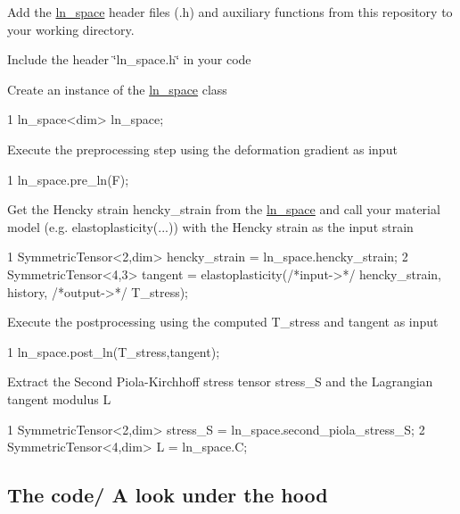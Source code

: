 \begin{DoxyItemize}
\item Add the \hyperlink{classln__space}{ln\+\_\+space} header files (.h) and auxiliary functions from this repository to your working directory.
\item Include the header \char`\"{}ln\+\_\+space.\+h\char`\"{} in your code
\item Create an instance of the \hyperlink{classln__space}{ln\+\_\+space} class 
\begin{DoxyCode}
1 ln\_space<dim> ln\_space;
\end{DoxyCode}

\item Execute the preprocessing step using the deformation gradient as input 
\begin{DoxyCode}
1 ln\_space.pre\_ln(F);
\end{DoxyCode}

\item Get the Hencky strain {\ttfamily hencky\+\_\+strain} from the \hyperlink{classln__space}{ln\+\_\+space} and call your material model (e.\+g. elastoplasticity(...)) with the Hencky strain as the input strain 
\begin{DoxyCode}
1 SymmetricTensor<2,dim> hencky\_strain = ln\_space.hencky\_strain;
2 SymmetricTensor<4,3> tangent = elastoplasticity(/*input->*/ hencky\_strain, history, /*output->*/ T\_stress);
\end{DoxyCode}

\item Execute the postprocessing using the computed {\ttfamily T\+\_\+stress} and tangent as input 
\begin{DoxyCode}
1 ln\_space.post\_ln(T\_stress,tangent);
\end{DoxyCode}

\item Extract the Second Piola-\/\+Kirchhoff stress tensor {\ttfamily stress\+\_\+S} and the Lagrangian tangent modulus {\ttfamily L} 
\begin{DoxyCode}
1 SymmetricTensor<2,dim> stress\_S = ln\_space.second\_piola\_stress\_S;
2 SymmetricTensor<4,dim> L = ln\_space.C;
\end{DoxyCode}

\end{DoxyItemize}

\subsection*{The code/ A look under the hood}

